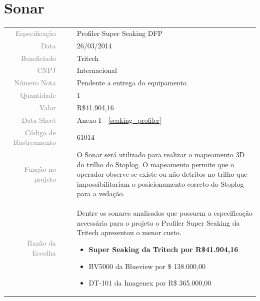 




\section{Sonar}
\label{sonar}


\begin{table}[ht!]

	\begin{tabular}{r l|l p{12cm} }
		
		\textcolor{gray}{Especificação} &&& 	{Profiler Super Seaking DFP}\\
		\textcolor{gray}{Data} &&& 				{26/03/2014}\\
        \textcolor{gray}{Beneficiado} &&&		{Tritech} \\
        \textcolor{gray}{CNPJ} &&& 				{Internacional} \\
        \textcolor{gray}{Número Nota} &&& 		{Pendente a entrega do equipamento} \\
		\textcolor{gray}{Quantidade} &&& 		{1} \\
		\textcolor{gray}{Valor} &&& 			{R\$41.904,16} \\
		\textcolor{gray}{Data Sheet} &&& 		{Anexo I - \ref{seaking_profiler}} \\
		\textcolor{gray}{Código de Rastreamento} &&& {61014} \\

		\textcolor{gray}{Função no projeto} &&& {O Sonar será utilizado para realizar o mapeamento 3D do trilho do Stoplog. O mapeamento permite que o operador observe se existe ou não detritos no trilho que impossibilitariam o posicionamento correto do Stoplog para a vedação. } \\
		\textcolor{gray}{Razão da Escolha} &&& {Dentre os sonares analisados que possuem a especificação necessária para o projeto o Profiler Super Seaking da Tritech apresentou o menor custo.   
		 \begin{itemize}
		  \item \textbf {Super Seaking da Tritech por R\$41.904,16}
		  \item BV5000 da Blueview por \$ 138.000,00 
		  \item DT-101 da Imagenex por R\$ 365.000,00
		\end{itemize}}

	\end{tabular}
\end{table}

